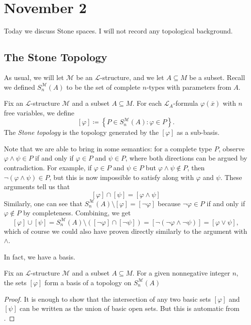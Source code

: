 \documentclass[../notes.tex]{subfiles}
\begin{document}
\section{November 2}

Today we discuss Stone spaces. I will not record any topological background.

\subsection{The Stone Topology}
As usual, we will let $\mathcal M$ be an $\mathcal L$-structure, and we let $A\subseteq M$ be a subset. Recall we defined $S_n^{\mathcal M}(A)$ to be the set of complete $n$-types with parameters from $A$.
\begin{definition}
	Fix an $\mathcal L$-structure $\mathcal M$ and a subset $A\subseteq M$. For each $\mathcal L_A$-formula $\varphi(\overline x)$ with $n$ free variables, we define
	\[[\varphi]\coloneqq\left\{P\in S_n^{\mathcal M}(A):\varphi\in P\right\}.\]
	The \textit{Stone topology} is the topology generated by the $[\varphi]$ as a sub-basis.
\end{definition}
\begin{remark} \label{rem:conjunct-is-intersect}
	Note that we are able to bring in some semantics: for a complete type $P$, observe $\varphi\land\psi\in P$ if and only if $\varphi\in P$ and $\psi\in P$, where both directions can be argued by contradiction. For example, if $\varphi\in P$ and $\psi\in P$ but $\varphi\land\psi\notin P$, then $\lnot(\varphi\land\psi)\in P$, but this is now impossible to satisfy along with $\varphi$ and $\psi$. These arguments tell us that
	\[[\varphi]\cap[\psi]=[\varphi\land\psi]\]
	Similarly, one can see that $S_n^{\mathcal M}(A)\setminus[\varphi]=[\lnot\varphi]$ because $\lnot\varphi\in P$ if and only if $\varphi\notin P$ by completeness. Combining, we get
	\[[\varphi]\cup[\psi]=S_n^{\mathcal M}(A)\setminus([\lnot\varphi]\cap[\lnot\psi])=[\lnot(\lnot\varphi\land\lnot\psi)]=[\varphi\lor\psi],\]
	which of course we could also have proven directly similarly to the argument with $\land$.
\end{remark}
In fact, we have a basis.
\begin{lemma} \label{lem:stone-is-basis}
	Fix an $\mathcal L$-structure $\mathcal M$ and a subset $A\subseteq M$. For a given nonnegative integer $n$, the sets $[\varphi]$ form a basis of a topology on $S_n^{\mathcal M}(A)$
\end{lemma}
\begin{proof}
	It is enough to show that the intersection of any two basic sets $[\varphi]$ and $[\psi]$ can be written as the union of basic open sets. But this is automatic from .
\end{proof}
\end{document}
